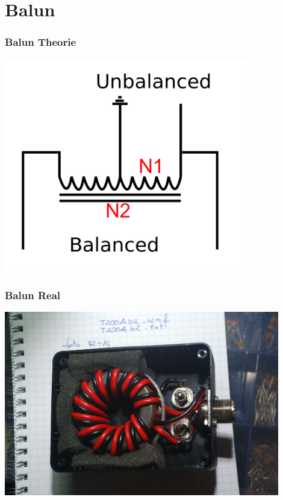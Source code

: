 \section*{Balun}

\begin{frame}
  \frametitle{Balun Theorie}
  \begin{center}
    \includegraphics[width=0.8\textwidth,height=.85\textheight,keepaspectratio]{a03/Cdbalun2.png}
    \tiny \hyperlink{refs}{\cite{wc}}
  \end{center}
\end{frame}

\begin{frame}
  \frametitle{Balun Real}
  \begin{center}
    \includegraphics[width=0.9\textwidth,height=.85\textheight,keepaspectratio]{a03/balun-Real.jpg}
    \tiny \hyperlink{refs}{\cite{wc}}
  \end{center}
\end{frame}


